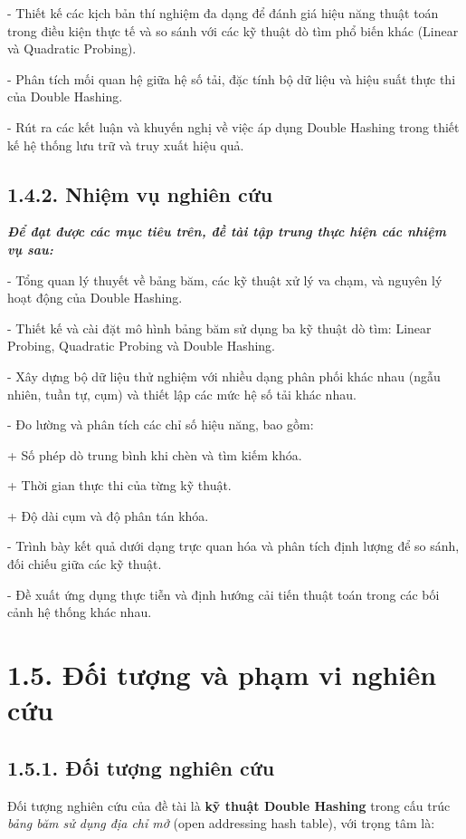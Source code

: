 \documentclass[12pt,a4paper]{report}
\begin{document}
- Thiết kế các kịch bản thí nghiệm đa dạng để đánh giá hiệu năng thuật toán trong điều kiện thực tế và so sánh với các kỹ thuật dò tìm phổ biến khác (Linear và Quadratic Probing).

- Phân tích mối quan hệ giữa hệ số tải, đặc tính bộ dữ liệu và hiệu suất thực thi của Double Hashing.

- Rút ra các kết luận và khuyến nghị về việc áp dụng Double Hashing trong thiết kế hệ thống lưu trữ và truy xuất hiệu quả.
\subsection*{1.4.2. Nhiệm vụ nghiên cứu}
\noindent \indent \textbf{\textit{Để đạt được các mục tiêu trên, đề tài tập trung thực hiện các nhiệm vụ sau:}}

- Tổng quan lý thuyết về bảng băm, các kỹ thuật xử lý va chạm, và nguyên lý hoạt động của Double Hashing.

- Thiết kế và cài đặt mô hình bảng băm sử dụng ba kỹ thuật dò tìm: Linear Probing, Quadratic Probing và Double Hashing.

- Xây dựng bộ dữ liệu thử nghiệm với nhiều dạng phân phối khác nhau (ngẫu nhiên, tuần tự, cụm) và thiết lập các mức hệ số tải khác nhau.

- Đo lường và phân tích các chỉ số hiệu năng, bao gồm:

\hspace{1cm}+ Số phép dò trung bình khi chèn và tìm kiếm khóa.

\hspace{1cm}+ Thời gian thực thi của từng kỹ thuật.

\hspace{1cm}+ Độ dài cụm và độ phân tán khóa.

- Trình bày kết quả dưới dạng trực quan hóa và phân tích định lượng để so sánh, đối chiếu giữa các kỹ thuật.

- Đề xuất ứng dụng thực tiễn và định hướng cải tiến thuật toán trong các bối cảnh hệ thống khác nhau.

\section*{1.5. Đối tượng và phạm vi nghiên cứu}
\subsection*{1.5.1. Đối tượng nghiên cứu}
\noindent \indent Đối tượng nghiên cứu của đề tài là \textbf{kỹ thuật Double Hashing} trong cấu trúc \textit{bảng băm sử dụng địa chỉ mở} (open addressing hash table), với trọng tâm là:
\end{document}
